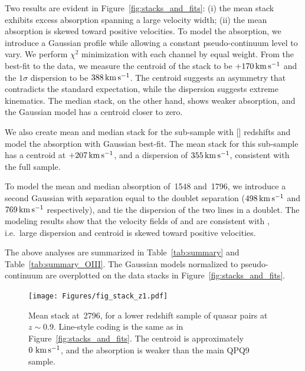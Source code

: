 \documentclass[iop]{emulateapj}
\begin{document}
Two results are evident in Figure~\ref{fig:stacks_and_fits}: (i) the mean  stack 
exhibits excess absorption spanning a large velocity width; (ii) the mean absorption is skewed 
toward positive velocities. To model the absorption, we introduce a Gaussian profile while 
allowing a constant pseudo-continuum level to vary. We perform $\chi^2$ minimization with each 
channel by equal weight. From the best-fit to the data, we measure the centroid of the  
stack to be $+170\,{\rm km\,s^{-1}}$ and the $1\sigma$ dispersion to be $388\,{\rm km\,s^{-1}}$. 
The centroid suggests an asymmetry that contradicts the standard expectation, while the dispersion 
suggests extreme kinematics. The median stack, on the other hand, shows weaker absorption, and the 
Gaussian model has a centroid closer to zero. 

We also create mean and median stack for the sub-sample with [] redshifts and model the 
absorption with Gaussian best-fit. The  mean stack for this sub-sample has a centroid at 
$+207\,{\rm km\,s^{-1}}$, and a dispersion of $355\,{\rm km\,s^{-1}}$, consistent with the full 
sample. 

To model the mean and median absorption of \,1548 and \,1796, we introduce a  
second Gaussian with separation equal to the doublet separation ($498\,{\rm km\,s^{-1}}$ and 
$769\,{\rm km\,s^{-1}}$ respectively), and tie the dispersion of the two lines in a doublet. The 
modeling results show that the velocity fields of  and  are consistent with 
, i.e.\ large dispersion and centroid is skewed toward positive velocities. 

The above analyses are summarized in Table~\ref{tab:summary} and Table~\ref{tab:summary_OIII}. The 
Gaussian models normalized to pseudo-continuum are overplotted on the data stacks in 
Figure~\ref{fig:stacks_and_fits}. 


%

%

\begin{figure}
\texttt{[image: Figures/fig\_stack\_z1.pdf]}
\caption{Mean stack at \,2796, for a lower redshift sample of quasar pairs at 
$z\sim0.9$. Line-style coding is the same as in Figure~\ref{fig:stacks_and_fits}. The centroid is 
approximately $0\,{\rm \,km\,s^{-1}}$, and the absorption is weaker than the main QPQ9 sample. 
}
\label{fig:stack_z1}
\end{figure}
\end{document}
